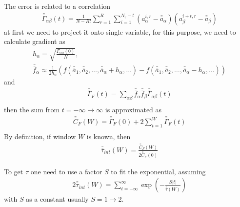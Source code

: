 The error is related to a correlation
\begin{equation}
\begin{split}
&\bar{\bar{\Gamma}} _{\alpha \beta}(t)=\frac{1}{N-Rt}\sum _{r=1}^R \sum _{i=1}^{N_r-t} \left(a^{i,r}_{\alpha}-\bar{\bar{a}}_{\alpha}\right)\left(a^{i+t,r}_{\beta}-\bar{\bar{a}}_{\beta}\right)
\end{split}
\end{equation}
at first we need to project it onto single variable, for this purpose, we need to calculate gradient as
\begin{equation}
\begin{split}
&h_{\alpha}=\sqrt{\frac{\Gamma _{\alpha\alpha}(0)}{N}},\\
&\bar{\bar{f}}_{\alpha}\approx \frac{1}{2h_{\alpha}}\left(f(\bar{\bar{a}}_1,\bar{\bar{a}}_2,\ldots, \bar{\bar{a}}_{\alpha}+h_{\alpha},\ldots)-f(\bar{\bar{a}}_1,\bar{\bar{a}}_2,\ldots, \bar{\bar{a}}_{\alpha}-h_{\alpha},\ldots)\right)
\end{split}
\end{equation}
and
\begin{equation}
\begin{split}
&\bar{\bar{\Gamma}} _F(t)=\sum _{\alpha\beta}\bar{\bar{f}}_{\alpha}\bar{\bar{f}}_{\beta}\bar{\bar{\Gamma}} _{\alpha\beta}(t)\\
\end{split}
\end{equation}
then the sum from $t=-\infty \to \infty$ is approximated as
\begin{equation}
\begin{split}
&\bar{\bar{C}} _F(W)=\bar{\bar{\Gamma}} _F(0)+2\sum _{t=1}^W\bar{\bar{\Gamma}} _F(t)\\
\end{split}
\end{equation}
By definition, if window $W$ is known, then
\begin{equation}
\begin{split}
&\bar{\bar{\tau}}_{int} (W) = \frac{\bar{\bar{C}} _F(W)}{2\bar{\bar{C}} _F(0)}
\end{split}
\end{equation}

To get $\tau$ one need to use a factor $S$ to fit the exponential, assuming
\begin{equation}
\begin{split}
&2\bar{\bar{\tau}} _{int} (W) = \sum _{t=-\infty}^{\infty}\exp\left(-\frac{S|t|}{\bar{\bar{\tau}} (W)}\right)
\end{split}
\end{equation}
with $S$ as a constant usually $S=1\to 2$.

